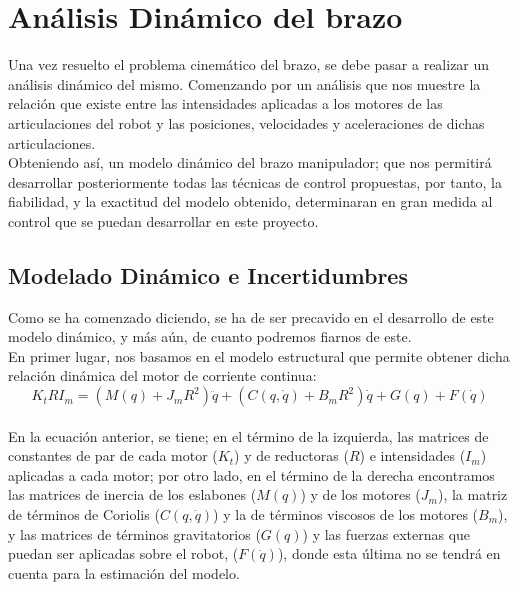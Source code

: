 \section{Análisis Dinámico del brazo}
Una vez resuelto el problema cinemático del brazo, se debe pasar a realizar un análisis dinámico del mismo. Comenzando por un análisis que nos muestre la relación que existe entre las intensidades aplicadas a los motores de las articulaciones del robot y las posiciones, velocidades y aceleraciones de dichas articulaciones.\\

Obteniendo así, un modelo dinámico del brazo manipulador; que nos permitirá desarrollar posteriormente todas las técnicas de control propuestas, por tanto, la fiabilidad, y la exactitud del modelo obtenido, determinaran en gran medida al control que se puedan desarrollar en este proyecto.





\subsection{Modelado Dinámico e Incertidumbres}

Como se ha comenzado diciendo, se ha de ser precavido en el desarrollo de este modelo dinámico, y más aún, de cuanto podremos fiarnos de este.\\
En primer lugar, nos basamos en el modelo estructural que permite obtener dicha relación dinámica del motor de corriente continua:\\



\begin{equation}
K_tRI_m=(M(q)+J_mR^2)\ddot{q}+(C(q,\dot{q})+B_mR^2)\dot{q}+G(q)+F(\dot{q})
\end{equation}\\



En la ecuación anterior, se tiene; en el término de la izquierda, las matrices de constantes de par de cada motor ($K_t$) y de reductoras ($R$) e intensidades ($I_m$) aplicadas a cada motor; por otro lado, en el término de la derecha encontramos las matrices de inercia de los eslabones ($M(q)$) y de los motores ($J_m$), la matriz de términos de Coriolis ($C(q,\dot{q})$) y la de términos viscosos de los motores ($B_m$), y las matrices de términos gravitatorios ($G(q)$) y las fuerzas externas que puedan ser aplicadas sobre el robot, ($F(\dot{q})$), donde esta última no se tendrá en cuenta para la estimación del modelo.\\

